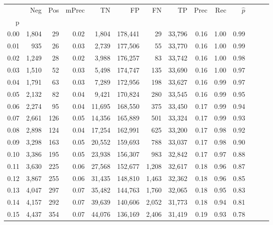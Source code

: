 \begin{tabular}{rrrrrrrrrrrrrr}
\toprule
{} &    Neg &  Pos & mPrec &       TN &       FP &      FN &      TP &  Prec &   Rec & $\hat{p}$ \\
p    &        &      &       &          &          &         &         &       &       &           \\
\midrule
0.00 &  1,804 &   29 &  0.02 &    1,804 &  178,441 &      29 &  33,796 &  0.16 &  1.00 &      0.99 \\
0.01 &    935 &   26 &  0.03 &    2,739 &  177,506 &      55 &  33,770 &  0.16 &  1.00 &      0.99 \\
0.02 &  1,249 &   28 &  0.02 &    3,988 &  176,257 &      83 &  33,742 &  0.16 &  1.00 &      0.98 \\
0.03 &  1,510 &   52 &  0.03 &    5,498 &  174,747 &     135 &  33,690 &  0.16 &  1.00 &      0.97 \\
0.04 &  1,791 &   63 &  0.03 &    7,289 &  172,956 &     198 &  33,627 &  0.16 &  0.99 &      0.97 \\
0.05 &  2,132 &   82 &  0.04 &    9,421 &  170,824 &     280 &  33,545 &  0.16 &  0.99 &      0.95 \\
0.06 &  2,274 &   95 &  0.04 &   11,695 &  168,550 &     375 &  33,450 &  0.17 &  0.99 &      0.94 \\
0.07 &  2,661 &  126 &  0.05 &   14,356 &  165,889 &     501 &  33,324 &  0.17 &  0.99 &      0.93 \\
0.08 &  2,898 &  124 &  0.04 &   17,254 &  162,991 &     625 &  33,200 &  0.17 &  0.98 &      0.92 \\
0.09 &  3,298 &  163 &  0.05 &   20,552 &  159,693 &     788 &  33,037 &  0.17 &  0.98 &      0.90 \\
0.10 &  3,386 &  195 &  0.05 &   23,938 &  156,307 &     983 &  32,842 &  0.17 &  0.97 &      0.88 \\
0.11 &  3,630 &  225 &  0.06 &   27,568 &  152,677 &   1,208 &  32,617 &  0.18 &  0.96 &      0.87 \\
0.12 &  3,867 &  255 &  0.06 &   31,435 &  148,810 &   1,463 &  32,362 &  0.18 &  0.96 &      0.85 \\
0.13 &  4,047 &  297 &  0.07 &   35,482 &  144,763 &   1,760 &  32,065 &  0.18 &  0.95 &      0.83 \\
0.14 &  4,157 &  292 &  0.07 &   39,639 &  140,606 &   2,052 &  31,773 &  0.18 &  0.94 &      0.81 \\
0.15 &  4,437 &  354 &  0.07 &   44,076 &  136,169 &   2,406 &  31,419 &  0.19 &  0.93 &      0.78 \\

\end{tabular}
